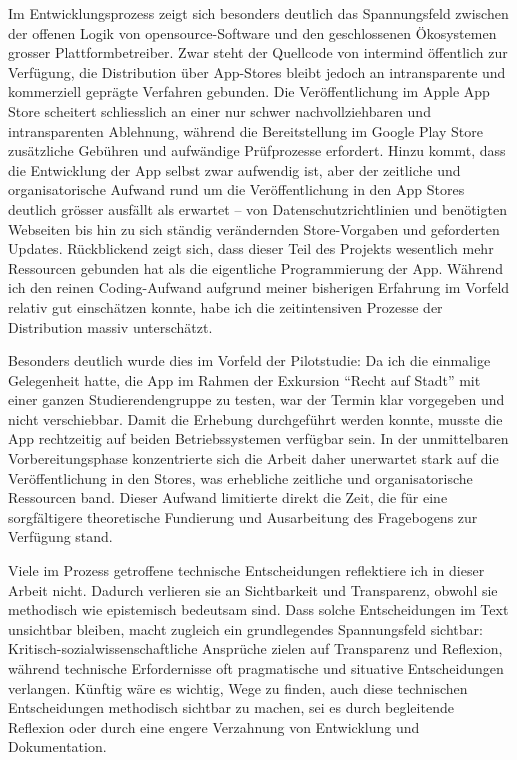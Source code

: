 \vspace{1em}

Im Entwicklungsprozess zeigt sich besonders deutlich das Spannungsfeld zwischen der offenen Logik von \gls{opensource}-Software und den geschlossenen Ökosystemen grosser Plattformbetreiber. Zwar steht der Quellcode von \gls{intermind} öffentlich zur Verfügung, die Distribution über App-Stores bleibt jedoch an intransparente und kommerziell geprägte Verfahren gebunden. Die Veröffentlichung im Apple App Store scheitert schliesslich an einer nur schwer nachvollziehbaren und intransparenten Ablehnung, während die Bereitstellung im Google Play Store zusätzliche Gebühren und aufwändige Prüfprozesse erfordert. Hinzu kommt, dass die Entwicklung der App selbst zwar aufwendig ist, aber der zeitliche und organisatorische Aufwand rund um die Veröffentlichung in den App Stores deutlich grösser ausfällt als erwartet – von Datenschutzrichtlinien und benötigten Webseiten bis hin zu sich ständig verändernden Store-Vorgaben und geforderten Updates. Rückblickend zeigt sich, dass dieser Teil des Projekts wesentlich mehr Ressourcen gebunden hat als die eigentliche Programmierung der App. Während ich den reinen Coding-Aufwand aufgrund meiner bisherigen Erfahrung im Vorfeld relativ gut einschätzen konnte, habe ich die zeitintensiven Prozesse der Distribution massiv unterschätzt.

Besonders deutlich wurde dies im Vorfeld der Pilotstudie: Da ich die einmalige Gelegenheit hatte, die App im Rahmen der Exkursion \enquote{Recht auf Stadt} mit einer ganzen Studierendengruppe zu testen, war der Termin klar vorgegeben und nicht verschiebbar. Damit die Erhebung durchgeführt werden konnte, musste die App rechtzeitig auf beiden Betriebssystemen verfügbar sein. In der unmittelbaren Vorbereitungsphase konzentrierte sich die Arbeit daher unerwartet stark auf die Veröffentlichung in den Stores, was erhebliche zeitliche und organisatorische Ressourcen band. Dieser Aufwand limitierte direkt die Zeit, die für eine sorgfältigere theoretische Fundierung und Ausarbeitung des Fragebogens zur Verfügung stand.

Viele im Prozess getroffene technische Entscheidungen reflektiere ich in dieser Arbeit nicht. Dadurch verlieren sie an Sichtbarkeit und Transparenz, obwohl sie methodisch wie epistemisch bedeutsam sind. Dass solche Entscheidungen im Text unsichtbar bleiben, macht zugleich ein grundlegendes Spannungsfeld sichtbar: Kritisch-sozialwissenschaftliche Ansprüche zielen auf Transparenz und Reflexion, während technische Erfordernisse oft pragmatische und situative Entscheidungen verlangen. Künftig wäre es wichtig, Wege zu finden, auch diese technischen Entscheidungen methodisch sichtbar zu machen, sei es durch begleitende Reflexion oder durch eine engere Verzahnung von Entwicklung und Dokumentation.

